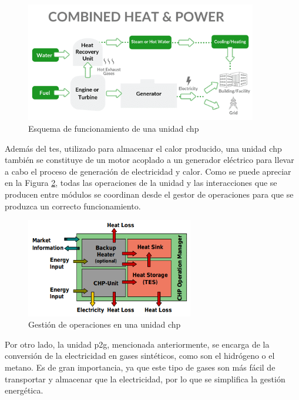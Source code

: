 \begin{figure}[h!]
  \centering
  \includegraphics[width=0.9\textwidth]{img/teoria/chp.png}
  \caption{Esquema de funcionamiento de una unidad \gls{chp} \cite{chp}}
  \label{fig:chp}
\end{figure}

Además del \gls{tes}, utilizado para almacenar el calor producido, una unidad \gls{chp} también se constituye de un motor acoplado a un generador eléctrico para llevar a cabo el proceso de generación de electricidad y calor. Como se puede apreciar en la Figura \ref{fig:chp2}, todas las operaciones de la unidad y las interacciones que se producen entre módulos se coordinan desde el gestor de operaciones para que se produzca un correcto funcionamiento.

\begin{figure}[h!]
  \centering
  \includegraphics[width=0.65\textwidth]{img/teoria/chp2.png}
  \caption{Gestión de operaciones en una unidad \gls{chp} \cite{chp2}}
  \label{fig:chp2}
\end{figure}

Por otro lado, la unidad \gls{p2g}, mencionada anteriormente, se encarga de la conversión de la electricidad en gases sintéticos, como son el hidrógeno o el metano. Es de gran importancia, ya que este tipo de gases son más fácil de transportar y almacenar que la electricidad, por lo que se simplifica la gestión energética. \cite{transactive}

